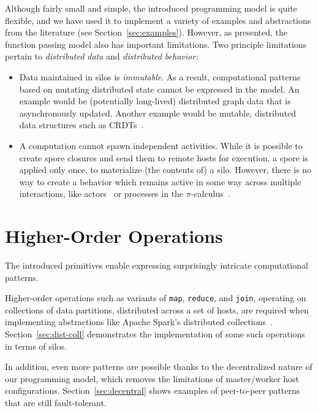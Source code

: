 \documentclass{jfp1}
\begin{document}
Although fairly small and simple, the introduced programming model is
quite flexible, and we have used it to implement a variety of examples
and abstractions from the literature (see Section~\ref{sec:examples}).
However, as presented, the function passing model also has important
limitations. Two principle limitations pertain to {\em distributed
  data} and {\em distributed behavior:}

\begin{itemize}

\item Data maintained in silos is {\em immutable}. As a result,
  computational patterns based on mutating distributed state cannot be
  expressed in the model. An example would be (potentially long-lived)
  distributed graph data that is asynchronously updated.  Another
  example would be mutable, distributed data structures such as
  CRDTs~\cite{ShapiroPBZ11}.

\item A computation cannot spawn independent activities. While it is
  possible to create spore closures and send them to remote hosts for
  execution, a spore is applied only once, to materialize (the
  contents of) a silo. However, there is no way to create a behavior
  which remains active in some way across multiple interactions, like
  actors~\cite{Actors} or processes in the
  $\pi$-calculus~\cite{milner:92a}.

\end{itemize}

\section{Higher-Order Operations}
\label{sec:higher-order-operations}


The introduced primitives enable expressing surprisingly intricate computational
patterns.

Higher-order operations such as variants of \verb|map|, \verb|reduce|, and
\verb|join|, operating on collections of data partitions, distributed across a
set of hosts, are required when implementing abstractions like Apache Spark's
distributed collections~\cite{Spark}. Section~\ref{sec:dist-coll} demonstrates
the implementation of some such operations in terms of silos.

In addition, even more patterns are possible thanks to the decentralized nature
of our programming model, which removes the limitations of master/worker host
configurations. Section~\ref{sec:decentral} shows examples of peer-to-peer
patterns that are still fault-tolerant.
\end{document}
